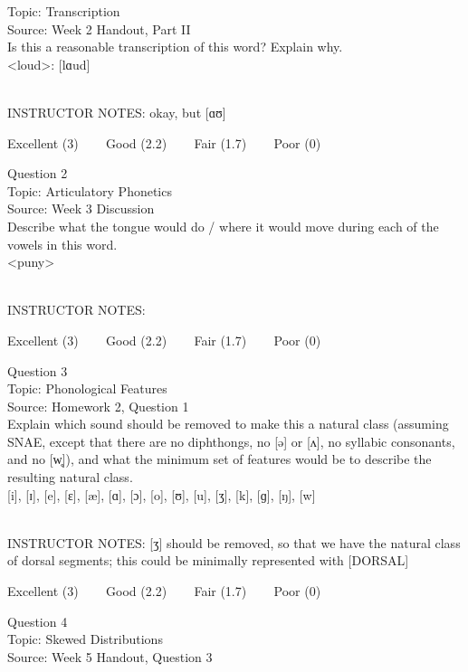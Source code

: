 \documentclass[12pt]{article}
\begin{document}
Topic: Transcription\\
Source: Week 2 Handout, Part II\\

Is this a reasonable transcription of this word? Explain why.\\

<loud>: {[lɑud]}


~\\
INSTRUCTOR NOTES: okay, but [ɑʊ]


\vfill
Excellent (3) ~~~ Good (2.2) ~~~ Fair (1.7) ~~~ Poor (0)
\newpage

{\large Question 2}\\

Topic: Articulatory Phonetics\\
Source: Week 3 Discussion\\

Describe what the tongue would do / where it would move during each of the vowels in this word.\\

<puny>


~\\
INSTRUCTOR NOTES: 


\vfill
Excellent (3) ~~~ Good (2.2) ~~~ Fair (1.7) ~~~ Poor (0)
\newpage

{\large Question 3}\\

Topic: Phonological Features\\
Source: Homework 2, Question 1\\

Explain which sound should be removed to make this a natural class (assuming SNAE, except that there are no diphthongs, no [ə] or [ʌ], no syllabic consonants, and no [w̥]), and what the minimum set of features would be to describe the resulting natural class.\\

{[i]}, {[ɪ]}, {[e]}, {[ɛ]}, {[æ]}, {[ɑ]}, {[ɔ]}, {[o]}, {[ʊ]}, {[u]}, {[ʒ]}, {[k]}, {[ɡ]}, {[ŋ]}, {[w]}


~\\
INSTRUCTOR NOTES: [ʒ] should be removed, so that we have the natural class of dorsal segments; this could be minimally represented with [DORSAL]


\vfill
Excellent (3) ~~~ Good (2.2) ~~~ Fair (1.7) ~~~ Poor (0)
\newpage

{\large Question 4}\\

Topic: Skewed Distributions\\
Source: Week 5 Handout, Question 3\\
\end{document}
